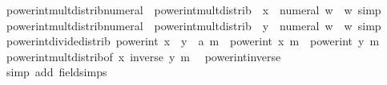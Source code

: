 \begin{isabellebody}
\endisatagproof
{\isafoldproof}%
%
\isadelimproof
\isanewline
%
\endisadelimproof
\isanewline
{}\isamarkupfalse%
\ power{\isacharunderscore}{\kern0pt}int{\isacharunderscore}{\kern0pt}mult{\isacharunderscore}{\kern0pt}distrib{\isacharunderscore}{\kern0pt}numeral{}\ {\isacharequal}{\kern0pt}\ power{\isacharunderscore}{\kern0pt}int{\isacharunderscore}{\kern0pt}mult{\isacharunderscore}{\kern0pt}distrib\ {\isacharbrackleft}{\kern0pt}\ x\ {\isacharequal}{\kern0pt}\ {\isachardoublequoteopen}numeral\ w{\isachardoublequoteclose}\ \ w{\isacharcomma}{\kern0pt}\ simp{\isacharbrackright}{\kern0pt}\isanewline
{}\isamarkupfalse%
\ power{\isacharunderscore}{\kern0pt}int{\isacharunderscore}{\kern0pt}mult{\isacharunderscore}{\kern0pt}distrib{\isacharunderscore}{\kern0pt}numeral{}\ {\isacharequal}{\kern0pt}\ power{\isacharunderscore}{\kern0pt}int{\isacharunderscore}{\kern0pt}mult{\isacharunderscore}{\kern0pt}distrib\ {\isacharbrackleft}{\kern0pt}\ y\ {\isacharequal}{\kern0pt}\ {\isachardoublequoteopen}numeral\ w{\isachardoublequoteclose}\ \ w{\isacharcomma}{\kern0pt}\ simp{\isacharbrackright}{\kern0pt}\isanewline
\isanewline
{}\isamarkupfalse%
\ power{\isacharunderscore}{\kern0pt}int{\isacharunderscore}{\kern0pt}divide{\isacharunderscore}{\kern0pt}distrib{\isacharcolon}{\kern0pt}\ {\isachardoublequoteopen}power{\isacharunderscore}{\kern0pt}int\ {\isacharparenleft}{\kern0pt}x\ {\isacharslash}{\kern0pt}\ y\ {\isacharcolon}{\kern0pt}{\isacharcolon}{\kern0pt}\ {\isacharprime}{\kern0pt}a{\isacharparenright}{\kern0pt}\ m\ {\isacharequal}{\kern0pt}\ power{\isacharunderscore}{\kern0pt}int\ x\ m\ {\isacharslash}{\kern0pt}\ power{\isacharunderscore}{\kern0pt}int\ y\ m{\isachardoublequoteclose}\isanewline
%
\isadelimproof
\ \ %
\endisadelimproof
%
\isatagproof
{}\isamarkupfalse%
\ power{\isacharunderscore}{\kern0pt}int{\isacharunderscore}{\kern0pt}mult{\isacharunderscore}{\kern0pt}distrib{\isacharbrackleft}{\kern0pt}of\ x\ {\isachardoublequoteopen}inverse\ y{\isachardoublequoteclose}\ m{\isacharbrackright}{\kern0pt}\ \isamarkupfalse%
\ power{\isacharunderscore}{\kern0pt}int{\isacharunderscore}{\kern0pt}inverse\isanewline
\ \ \isamarkupfalse%
\ {\isacharparenleft}{\kern0pt}simp\ add{\isacharcolon}{\kern0pt}\ field{\isacharunderscore}{\kern0pt}simps{\isacharparenright}{\kern0pt}%
\endisatagproof
{\isafoldproof}%
%
\isadelimproof
\isanewline
%
\endisadelimproof
\isanewline
{}\isamarkupfalse%

\end{isabellebody}
